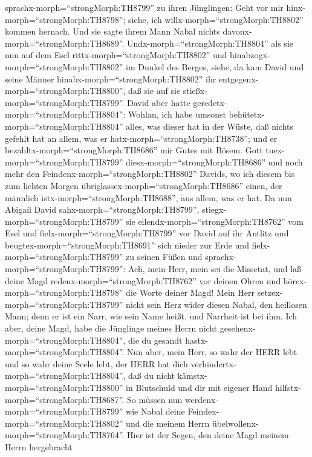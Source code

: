 sprachx-morph=``strongMorph:TH8799'' zu ihren Jünglingen: Geht vor mir
hinx-morph=``strongMorph:TH8798''; siehe, ich
willx-morph=``strongMorph:TH8802'' kommen hernach. Und sie sagte ihrem
Mann Nabal nichts davonx-morph=``strongMorph:TH8689''. 
Undx-morph=``strongMorph:TH8804'' als sie nun auf dem Esel
rittx-morph=``strongMorph:TH8802'' und
hinabzogx-morph=``strongMorph:TH8802'' im Dunkel des Berges, siehe, da
kam David und seine Männer hinabx-morph=``strongMorph:TH8802'' ihr
entgegenx-morph=``strongMorph:TH8800'', daß sie auf sie
stießx-morph=``strongMorph:TH8799''.  David aber hatte
geredetx-morph=``strongMorph:TH8804'': Wohlan, ich habe umsonst
behütetx-morph=``strongMorph:TH8804'' alles, was dieser hat in der
Wüste, daß nichts gefehlt hat an allem, was er
hatx-morph=``strongMorph:TH8738''; und er
bezahltx-morph=``strongMorph:TH8686'' mir Gutes mit Bösem. 
Gott tuex-morph=``strongMorph:TH8799''
diesx-morph=``strongMorph:TH8686'' und noch mehr den
Feindenx-morph=``strongMorph:TH8802'' Davids, wo ich diesem bis zum
lichten Morgen übriglassex-morph=``strongMorph:TH8686'' einen, der
männlich istx-morph=``strongMorph:TH8688'', aus allem, was er hat.
 Da nun Abigail David sahx-morph=``strongMorph:TH8799'',
stiegx-morph=``strongMorph:TH8799'' sie
eilendx-morph=``strongMorph:TH8762'' vom Esel und
fielx-morph=``strongMorph:TH8799'' vor David auf ihr Antlitz und
beugtex-morph=``strongMorph:TH8691'' sich nieder zur Erde 
und fielx-morph=``strongMorph:TH8799'' zu seinen Füßen und
sprachx-morph=``strongMorph:TH8799'': Ach, mein Herr, mein sei die
Missetat, und laß deine Magd redenx-morph=``strongMorph:TH8762'' vor
deinen Ohren und hörex-morph=``strongMorph:TH8798'' die Worte deiner
Magd!  Mein Herr setzex-morph=``strongMorph:TH8799'' nicht
sein Herz wider diesen Nabal, den heillosen Mann; denn er ist ein Narr,
wie sein Name heißt, und Narrheit ist bei ihm. Ich aber, deine Magd,
habe die Jünglinge meines Herrn nicht
gesehenx-morph=``strongMorph:TH8804'', die du gesandt
hastx-morph=``strongMorph:TH8804''.  Nun aber, mein Herr,
so wahr der HERR lebt und so wahr deine Seele lebt, der HERR hat dich
verhindertx-morph=``strongMorph:TH8804'', daß du nicht
kämstx-morph=``strongMorph:TH8800'' in Blutschuld und dir mit eigener
Hand hilfstx-morph=``strongMorph:TH8687''. So müssen nun
werdenx-morph=``strongMorph:TH8799'' wie Nabal deine
Feindex-morph=``strongMorph:TH8802'' und die meinem Herrn
übelwollenx-morph=``strongMorph:TH8764''.  Hier ist der
Segen, den deine Magd meinem Herrn hergebracht
